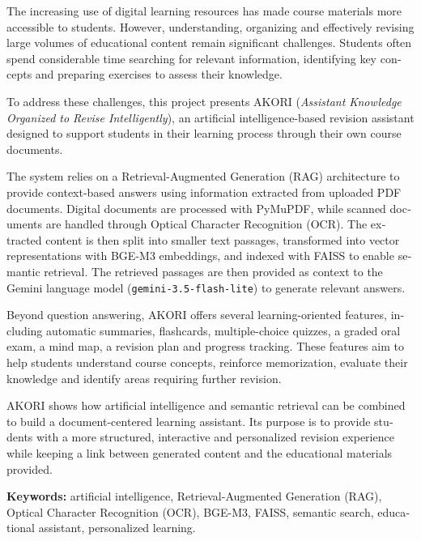 \documentclass[12pt,a4paper,oneside]{report}
\begin{document}
\begin{otherlanguage}{english}
The increasing use of digital learning resources has made course materials more accessible to students. However, understanding, organizing and effectively revising large volumes of educational content remain significant challenges. Students often spend considerable time searching for relevant information, identifying key concepts and preparing exercises to assess their knowledge.

To address these challenges, this project presents AKORI (\emph{Assistant Knowledge Organized to Revise Intelligently}), an artificial intelligence-based revision assistant designed to support students in their learning process through their own course documents.

The system relies on a Retrieval-Augmented Generation (RAG) architecture to provide context-based answers using information extracted from uploaded PDF documents. Digital documents are processed with PyMuPDF, while scanned documents are handled through Optical Character Recognition (OCR). The extracted content is then split into smaller text passages, transformed into vector representations with BGE-M3 embeddings, and indexed with FAISS to enable semantic retrieval. The retrieved passages are then provided as context to the Gemini language model (\texttt{gemini-3.5-flash-lite}) to generate relevant answers.

Beyond question answering, AKORI offers several learning-oriented features, including automatic summaries, flashcards, multiple-choice quizzes, a graded oral exam, a mind map, a revision plan and progress tracking. These features aim to help students understand course concepts, reinforce memorization, evaluate their knowledge and identify areas requiring further revision.

AKORI shows how artificial intelligence and semantic retrieval can be combined to build a document-centered learning assistant. Its purpose is to provide students with a more structured, interactive and personalized revision experience while keeping a link between generated content and the educational materials provided.

\vspace{0.5cm}
\noindent\textbf{Keywords:} artificial intelligence, Retrieval-Augmented Generation (RAG), Optical Character Recognition (OCR), BGE-M3, FAISS, semantic search, educational assistant, personalized learning.
\end{otherlanguage}

\tableofcontents
\listoffigures
\listoftables
\end{document}
